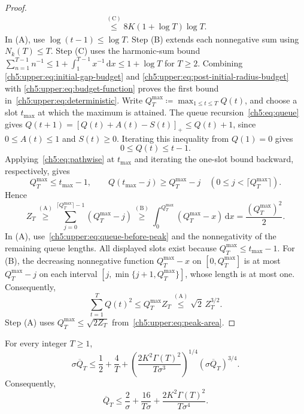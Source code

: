 \begin{proof}
\begin{equation}
\begin{aligned}
 \overset{\mathrm{(C)}}{\le}8K(1+\log T)\log T.
\end{aligned}
\label{ch5:upper:eq:post-initial-radius-budget}
\end{equation}
In (A), use $\log(t-1)\le\log T$. Step (B) extends each nonnegative sum using
$N_k(T)\le T$. Step (C) uses the harmonic-sum bound
$\sum_{n=1}^{T-1}n^{-1}\le1+\int_1^{T-1}x^{-1}\,\mathrm dx
\le1+\log T$ for $T\ge2$. Combining
\eqref{ch5:upper:eq:initial-gap-budget} and
\eqref{ch5:upper:eq:post-initial-radius-budget} with
\eqref{ch5:upper:eq:budget-function} proves the first
bound in~\eqref{ch5:upper:eq:deterministic}.
Write $Q_T^{\max}\coloneqq\max_{1\le t\le T}Q(t)$, and choose a slot
$t_{\max}$ at which the maximum is attained.
The queue recursion~\eqref{ch5:eq:queue} gives
$Q(t+1)=[Q(t)+A(t)-S(t)]_+\le Q(t)+1$,
since $0\le A(t)\le1$ and $S(t)\ge0$. Iterating this inequality
from $Q(1)=0$ gives
\begin{equation}
 0\le Q(t)\le t-1.
 \label{ch5:eq:pathwise}
\end{equation}
Applying~\eqref{ch5:eq:pathwise} at $t_{\max}$ and iterating the one-slot
bound backward, respectively, gives
\begin{equation}
Q_T^{\max}\le t_{\max}-1,\qquad
Q(t_{\max}-j)\ge Q_T^{\max}-j
\quad(0\le j<\lceil Q_T^{\max}\rceil).
 \label{ch5:upper:eq:queue-before-peak}
\end{equation}
Hence
\begin{equation}
Z_T\overset{\mathrm{(A)}}{\ge}
 \sum_{j=0}^{\lceil Q_T^{\max}\rceil-1}(Q_T^{\max}-j)
\overset{\mathrm{(B)}}{\ge}
 \int_0^{Q_T^{\max}}(Q_T^{\max}-x)\,\mathrm dx
 =\frac{(Q_T^{\max})^2}{2}.
 \label{ch5:upper:eq:peak-area}
\end{equation}
In (A), use~\eqref{ch5:upper:eq:queue-before-peak} and the
nonnegativity of the remaining queue lengths. All displayed slots exist
because $Q_T^{\max}\le t_{\max}-1$. For (B), the decreasing nonnegative function
$Q_T^{\max}-x$ on $[0,Q_T^{\max}]$ is at most $Q_T^{\max}-j$ on each interval
$[j,\min\{j+1,Q_T^{\max}\}]$, whose length is at most one.
Consequently,
\[
\sum_{t=1}^{T}Q(t)^2
\le Q_T^{\max}Z_T
\overset{\mathrm{(A)}}{\le}\sqrt2\,Z_T^{3/2}.
\]
Step (A) uses $Q_T^{\max}\le\sqrt{2Z_T}$ from~\eqref{ch5:upper:eq:peak-area}.
\end{proof}

\begin{Thm:Lemma}
\label{ch5:upper:lem:stage-two}
For every integer $T\ge1$,
\begin{equation}
 \sigma\overline Q_T\le\frac12+\frac4T
 +\left(\frac{2K^2\Gamma(T)^2}{T\sigma^3}\right)^{1/4}
  (\sigma\overline Q_T)^{3/4}.
 \label{ch5:upper:eq:implicit-drift}
\end{equation}
Consequently,
\begin{equation}
 \overline Q_T\le\frac2\sigma+\frac{16}{T\sigma}
 +\frac{2K^2\Gamma(T)^2}{T\sigma^4}.
 \label{ch5:upper:eq:stage-two}
\end{equation}
\end{Thm:Lemma}

